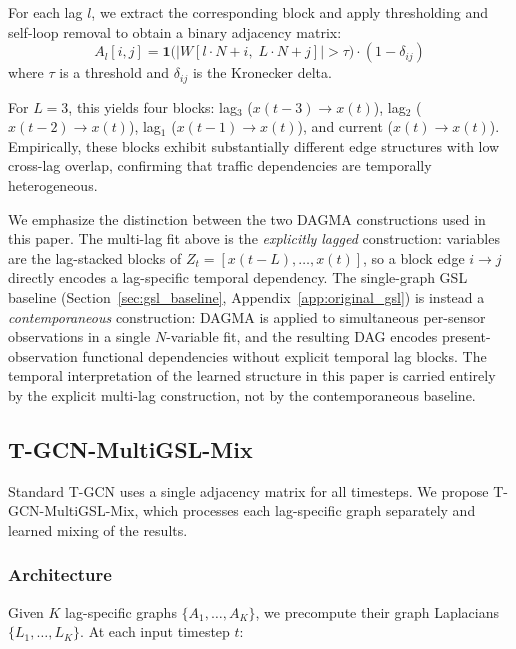 For each lag $l$, we extract the corresponding block and apply thresholding and self-loop removal to obtain a binary adjacency matrix:
\begin{equation}
A_l[i,j] = \mathbf{1}\big(|W[l \cdot N + i,\; L \cdot N + j]| > \tau\big) \cdot (1 - \delta_{ij})
\end{equation}
where $\tau$ is a threshold and $\delta_{ij}$ is the Kronecker delta.

For $L=3$, this yields four blocks: lag$_3$ ($x(t{-}3) \rightarrow x(t)$), lag$_2$ ($x(t{-}2) \rightarrow x(t)$), lag$_1$ ($x(t{-}1) \rightarrow x(t)$), and current ($x(t) \rightarrow x(t)$). Empirically, these blocks exhibit substantially different edge structures with low cross-lag overlap, confirming that traffic dependencies are temporally heterogeneous.

We emphasize the distinction between the two DAGMA constructions used in this paper. The multi-lag fit above is the \emph{explicitly lagged} construction: variables are the lag-stacked blocks of $Z_t = [x(t{-}L), \ldots, x(t)]$, so a block edge $i \rightarrow j$ directly encodes a lag-specific temporal dependency. The single-graph GSL baseline (Section~\ref{sec:gsl_baseline}, Appendix~\ref{app:original_gsl}) is instead a \emph{contemporaneous} construction: DAGMA is applied to simultaneous per-sensor observations in a single $N$-variable fit, and the resulting DAG encodes present-observation functional dependencies without explicit temporal lag blocks. The temporal interpretation of the learned structure in this paper is carried entirely by the explicit multi-lag construction, not by the contemporaneous baseline.

\subsection{T-GCN-MultiGSL-Mix}\label{sec:gatedmulti}

Standard T-GCN uses a single adjacency matrix for all timesteps. We propose T-GCN-MultiGSL-Mix, which processes each lag-specific graph separately and learned mixing of the results.

\subsubsection{Architecture}

Given $K$ lag-specific graphs $\{A_1, \ldots, A_K\}$, we precompute their graph Laplacians $\{L_1, \ldots, L_K\}$. At each input timestep $t$:

